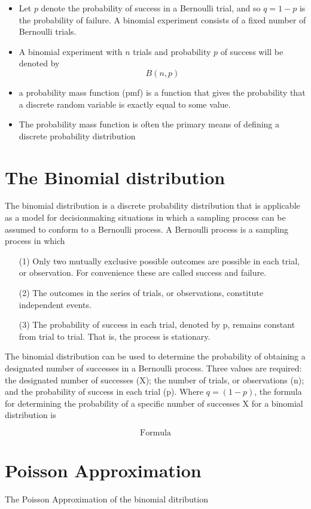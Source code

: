 \documentclass[12pt]{report}
\begin{document}
{{{\begin{itemize}
		\item
		Let $p$ denote the probability of success in a Bernoulli trial, and so $q = 1 - p$ is the probability of failure.
		A binomial experiment consists of a fixed number of Bernoulli trials. \item A binomial experiment with $n$ trials and
		probability $p$ of success will be denoted by
		\[B(n, p)\]
		\item a probability mass function (pmf) is a function that gives the probability that a 
		discrete random variable is exactly equal to some value. 
		\item The probability mass function is often the primary means of defining a discrete probability distribution 
	\end{itemize}
}
\section{The Binomial distribution }

The binomial distribution  is a discrete probability distribution that is applicable as a model for decisionmaking
situations in which a sampling process can be assumed to conform to a Bernoulli process. A Bernoulli
process is a sampling process in which
\begin{itemize}
\item[(1)] Only two mutually exclusive possible outcomes are possible in each trial, or observation. For
convenience these are called success and failure.
\item[(2)] The outcomes in the series of trials, or observations, constitute independent events.
\item[(3)] The probability of success in each trial, denoted by p, remains constant from trial to trial. That is,
the process is stationary.
\end{itemize}

The binomial distribution can be used to determine the probability of obtaining a designated number of
successes in a Bernoulli process. Three values are required: the designated number of successes (X); the number
of trials, or observations (n); and the probability of success in each trial (p). Where $q = (1 - p)$, the formula for
determining the probability of a specific number of successes X for a binomial distribution is

\[ \mbox{Formula} \]

\newpage
\section{Poisson Approximation}
The Poisson Approximation of the binomial ditribution

}}
\end{document}
